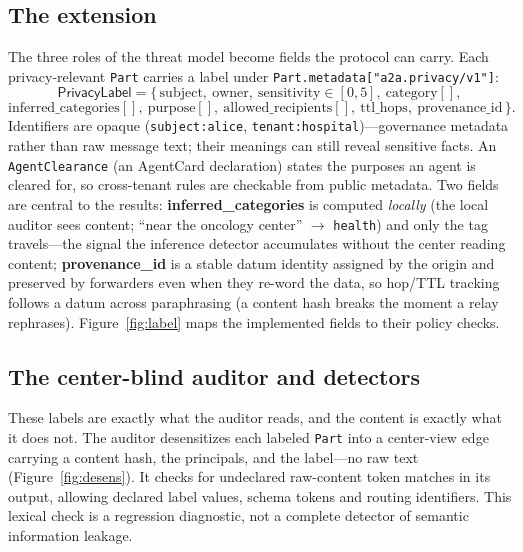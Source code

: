\subsection{The \ext{} extension}\label{app:ext-detail}
The three roles of the threat model become fields the protocol can carry. Each
privacy-relevant \texttt{Part} carries a label under
\texttt{Part.metadata["a2a.privacy/v1"]}:
\[
\textsf{PrivacyLabel} = \{\,
\text{subject},\ \text{owner},\ \text{sensitivity}\!\in\![0,5],\ \text{category}[],
\]
\[
\text{inferred\_categories}[],\ \text{purpose}[],\ \text{allowed\_recipients}[],\
\text{ttl\_hops},\ \text{provenance\_id}\,\}.
\]
Identifiers are opaque (\texttt{subject:alice}, \texttt{tenant:hospital})---governance
metadata rather than raw message text; their meanings can still reveal sensitive facts. An \texttt{AgentClearance} (an AgentCard declaration)
states the purposes an agent is cleared for, so cross-tenant rules are checkable
from public metadata. Two fields are central to the results:
\textbf{inferred\_categories} is computed \emph{locally} (the local auditor sees
content; ``near the oncology center'' $\rightarrow$ \texttt{health}) and only the
tag travels---the signal the inference detector accumulates without the center
reading content; \textbf{provenance\_id} is a stable datum identity assigned by the
origin and preserved by forwarders even when they re-word the data, so hop/TTL
tracking follows a datum across paraphrasing (a content hash breaks the moment a relay rephrases).
Figure~\ref{fig:label} maps the implemented fields to their policy checks.



\subsection{The center-blind auditor and detectors}\label{app:auditor-detail}
These labels are exactly what the auditor reads, and the content is exactly what
it does not. The auditor desensitizes each labeled \texttt{Part} into a
center-view edge carrying a content hash, the principals, and the
label---no raw text (Figure~\ref{fig:desens}). It
checks for undeclared raw-content token matches in its output, allowing declared
label values, schema tokens and routing identifiers. This lexical check is a
regression diagnostic, not a complete detector of semantic information leakage.

